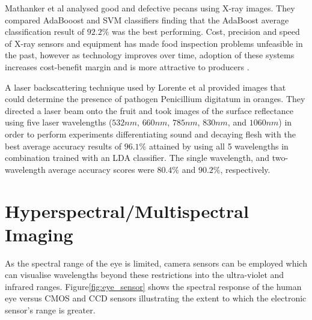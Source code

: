 \documentclass[fleqn,twoside,12pt]{report}
\begin{document}
Mathanker et al \cite{mathanker} analysed good and defective pecans using X-ray images. They compared AdaBooost and SVM classifiers finding that the AdaBoost average classification result of $92.2\%$ was the best performing. Cost, precision and speed of X-ray sensors and equipment has made food inspection problems unfeasible in the past, however as technology improves over time, adoption of these systems increases cost-benefit margin and is more attractive to producers \cite{haff}.

A laser backscattering technique used by Lorente et al \cite{lorente} provided images that could determine the presence of pathogen Penicillium digitatum in oranges. They directed a laser beam onto the fruit and took images of the surface reflectance using five laser wavelengths ($532nm$, $660nm$, $785nm$, $830nm$, and $1060nm$) in order to perform experiments differentiating sound and decaying flesh with the best average accuracy results of $96.1\%$ attained by using all 5 wavelengths in combination trained with an LDA classifier. The single wavelength, and two-wavelength average accuracy scores were $80.4\%$ and $90.2\%$, respectively.



\section{Hyperspectral/Multispectral Imaging}
\label{sec:lit_hyperspec}

As the spectral range of the eye is limited, camera sensors can be employed which can visualise wavelengths beyond these restrictions into the ultra-violet and infrared ranges. Figure\ref{fig:eye_sensor} shows the spectral response of the human eye versus CMOS and CCD sensors illustrating the extent to which the electronic sensor's range is greater.
\end{document}
